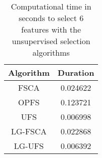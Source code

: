 \begin{table}
	\begin{center}
		\begin{tabular}{c c}
			Algorithm & Duration \\
			\hline
			FSCA & 0.024622 \\
			OPFS & 0.123721 \\
			UFS & 0.006998 \\
			LG-FSCA & 0.022868 \\
			LG-UFS & 0.006392 \\
		\end{tabular}
	\end{center}
	\caption{Computational time in seconds to select 6 features with the unsupervised selection algorithms}
\end{table}